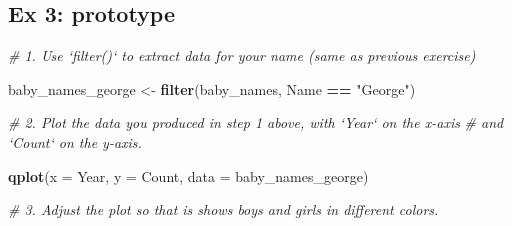 \documentclass[]{book}
\newenvironment{Shaded}{\begin{snugshade}}{\end{snugshade}}
\newcommand{\KeywordTok}[1]{\textcolor[rgb]{0.13,0.29,0.53}{\textbf{#1}}}
\newcommand{\DataTypeTok}[1]{\textcolor[rgb]{0.13,0.29,0.53}{#1}}
\newcommand{\StringTok}[1]{\textcolor[rgb]{0.31,0.60,0.02}{#1}}
\newcommand{\CommentTok}[1]{\textcolor[rgb]{0.56,0.35,0.01}{\textit{#1}}}
\newcommand{\OperatorTok}[1]{\textcolor[rgb]{0.81,0.36,0.00}{\textbf{#1}}}
\newcommand{\NormalTok}[1]{#1}
\begin{document}
\begin{Shaded}
\end{Shaded}

\subsection{Ex 3: prototype}\label{ex-3-prototype}

\begin{Shaded}
\begin{Highlighting}[]
\CommentTok{# 1. Use `filter()` to extract data for your name (same as previous exercise)  }
\end{Highlighting}
\end{Shaded}

\begin{Shaded}
\begin{Highlighting}[]
\NormalTok{baby_names_george <-}\StringTok{ }\KeywordTok{filter}\NormalTok{(baby_names, Name }\OperatorTok{==}\StringTok{ "George"}\NormalTok{)}
\end{Highlighting}
\end{Shaded}

\begin{Shaded}
\begin{Highlighting}[]
\CommentTok{# 2.  Plot the data you produced in step 1 above, with `Year` on the x-axis}
\CommentTok{#     and `Count` on the y-axis.}
\end{Highlighting}
\end{Shaded}

\begin{Shaded}
\begin{Highlighting}[]
\KeywordTok{qplot}\NormalTok{(}\DataTypeTok{x =}\NormalTok{ Year, }\DataTypeTok{y =}\NormalTok{ Count, }\DataTypeTok{data =}\NormalTok{ baby_names_george)}
\end{Highlighting}
\end{Shaded}

\begin{Shaded}
\begin{Highlighting}[]
\CommentTok{# 3. Adjust the plot so that is shows boys and girls in different colors.}
\end{Highlighting}
\end{Shaded}
\end{document}
